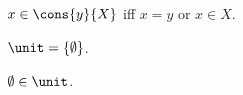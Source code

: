 \begin{axiom}\label{cons}
    $x\in \cons{y}{X}$ iff $x = y$ or $x\in X$.
\end{axiom}

\begin{definition}\label{unit}
    $\unit = \{\emptyset\}$.
\end{definition}

\begin{proposition}\label{emptyset_in_unit}
    $\emptyset\in\unit$.
\end{proposition}
